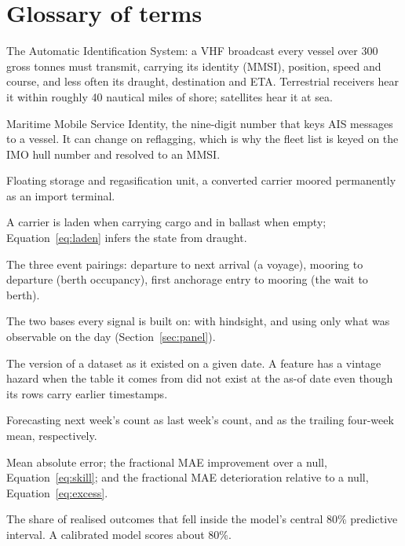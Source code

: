 \section{Glossary of terms}\label{app:glossary}

\begin{description}[nosep,leftmargin=0em,style=unboxed,font=\normalfont\itshape]
\item[AIS.] The Automatic Identification System: a VHF broadcast every vessel over
  300 gross tonnes must transmit, carrying its identity (MMSI), position, speed and
  course, and less often its draught, destination and ETA. Terrestrial receivers
  hear it within roughly 40 nautical miles of shore; satellites hear it at sea.
\item[MMSI.] Maritime Mobile Service Identity, the nine-digit number that keys AIS
  messages to a vessel. It can change on reflagging, which is why the fleet list is
  keyed on the IMO hull number and resolved to an MMSI.
\item[FSRU.] Floating storage and regasification unit, a converted carrier moored
  permanently as an import terminal.
\item[Laden, ballast.] A carrier is laden when carrying cargo and in ballast when
  empty; Equation~\eqref{eq:laden} infers the state from draught.
\item[Leg, visit, queue.] The three event pairings: departure to next arrival
  (a voyage), mooring to departure (berth occupancy), first anchorage entry to
  mooring (the wait to berth).
\item[Physical, knowable.] The two bases every signal is built on: with hindsight,
  and using only what was observable on the day (Section~\ref{sec:panel}).
\item[Vintage.] The version of a dataset as it existed on a given date. A feature
  has a vintage hazard when the table it comes from did not exist at the as-of date
  even though its rows carry earlier timestamps.
\item[Persistence null, climatology null.] Forecasting next week's count as last
  week's count, and as the trailing four-week mean, respectively.
\item[MAE, skill, excess.] Mean absolute error; the fractional MAE improvement over
  a null, Equation~\eqref{eq:skill}; and the fractional MAE deterioration relative
  to a null, Equation~\eqref{eq:excess}.
\item[80\% coverage.] The share of realised outcomes that fell inside the model's
  central 80\% predictive interval. A calibrated model scores about 80\%.

\end{description}
